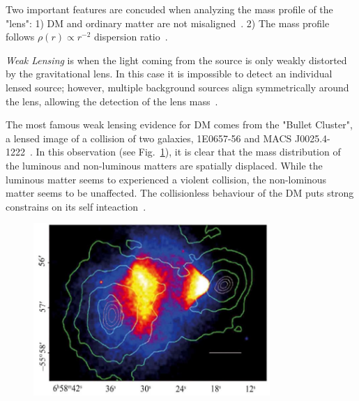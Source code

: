 Two important features are concuded when analyzing the mass profile of the "lens": 1) DM and ordinary matter are not misaligned~\cite{Ferreras:2007na}. 2) The mass profile follows $\rho(r)\propto r^{-2}$ dispersion ratio~\cite{Gavazzi:2007vw}. 

\textit{Weak Lensing} is when the light coming from the source is only weakly distorted by the gravitational lens. In this case it is impossible to detect an individual lensed source; however, multiple background sources align symmetrically around the lens, allowing the detection of the lens mass~\cite{Kaiser:1992ps}.

The most famous weak lensing evidence for DM comes from the "Bullet Cluster", a lensed image of a collision of two galaxies, 1E0657-56 and MACS J0025.4-1222~\cite{Clowe:2006eq}. In this observation (see Fig.~\ref{fig:Bullet}), it is clear that the mass distribution of the luminous and non-luminous matters are spatially displaced. While the luminous matter seems to experienced a violent collision, the non-lominous matter seems to be unaffected. The collisionless behaviour of the DM puts strong constrains on its self inteaction~\cite{Randall:2007ph}. 

 \begin{figure}[]
	\centering
	\includegraphics[width=0.8\textwidth]{figs/bulletCluster.jpg}
	\label{fig:Bullet}
\end{figure}  



